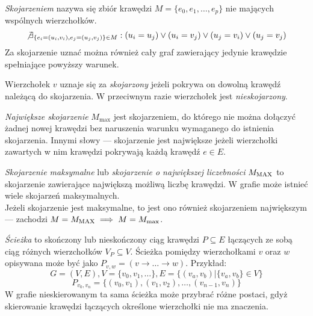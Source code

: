 \begin{definition}
  \emph{Skojarzeniem} nazywa się zbiór krawędzi $M=\{e_0, e_1, \ldots, e_p\}$
  nie mających wspólnych wierzchołków.
  \[\not\exists_{\{e_i=(u_i,v_i), e_j=(u_j, v_j)\} \in M}: (u_i=u_j) \lor (u_i=v_j) \lor (u_j=v_i) \lor (u_j=v_j)\]
  Za skojarzenie uznać można również cały graf zawierający jedynie krawędzie
  spełniające powyższy warunek.
\end{definition}

\begin{definition}
  Wierzchołek $v$ uznaje się za \emph{skojarzony} jeżeli pokrywa on dowolną
  krawędź należącą do skojarzenia.
  W przeciwnym razie wierzchołek jest \emph{nieskojarzony}.
\end{definition}

\begin{definition}
  \emph{Największe skojarzenie} $M_{\max}$ jest skojarzeniem, do którego nie można
  dołączyć żadnej nowej krawędzi bez naruszenia warunku wymaganego do istnienia
  skojarzenia. 
  Innymi słowy --- skojarzenie jest największe jeżeli wierzchołki zawartych w nim
  krawędzi pokrywają każdą krawędź $e \in E$.
\end{definition}

\begin{definition}
  \emph{Skojarzenie maksymalne} lub \emph{skojarzenie o największej liczebności}
  $M_{\textnormal{MAX}}$ to skojarzenie zawierające największą możliwą liczbę krawędzi.
  W grafie może istnieć wiele skojarzeń maksymalnych.\\
  Jeżeli skojarzenie jest maksymalne, to jest ono również skojarzeniem największym --- zachodzi $M=M_{\textnormal{MAX}} \implies M=M_{\max}$.
\end{definition}

\begin{definition}
  \emph{Ścieżka} to skończony lub nieskończony ciąg krawędzi 
  $P \subseteq E$ łączących ze sobą ciąg różnych wierzchołków
  $V_P \subseteq V$.
  Ścieżka pomiędzy wierzchołkami $v$ oraz $w$ opisywana może być jako $P_{v,w} = (v \rightarrow \ldots \rightarrow w)$.
  Przykład:
  \[G=(V,E), V=\{v_0, v_1, \ldots\}, E=\{(v_a, v_b)| \{v_a, v_b\} \in V\}\]
  \[P_{v_0, v_n}=\{(v_0, v_1), (v_1, v_2), \ldots, (v_{n-1}, v_n)\}\]
  W grafie nieskierowanym ta sama ścieżka może przybrać różne postaci, gdyż
  skierowanie krawędzi łączących określone wierzchołki nie ma znaczenia.
\end{definition}

